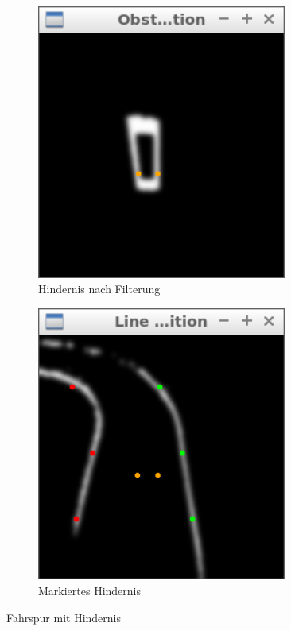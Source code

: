 \begin{figure}
\begin{subfigure}{0.45\textwidth}
		\includegraphics[width=0.9\textwidth]{images/obstacle_alone_bw.png}
		\caption{Hindernis nach Filterung}
	\end{subfigure}
	\begin{subfigure}{0.45\textwidth}
		\centering
		\includegraphics[width=0.9\textwidth]{images/obstacle_bw.png}
		\caption{Markiertes Hindernis}
	\end{subfigure}
	\caption{Fahrspur mit Hindernis}
\end{figure}
\label{Bild von Hindernis}

